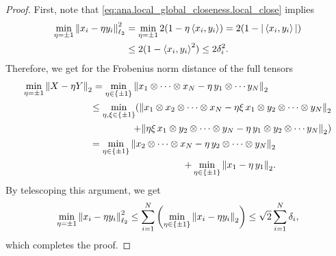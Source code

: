 \begin{proof}
  First, note that \cref{eq:ana.local_global_closeness.local_close} implies
  \begin{align}
    \min_{\eta = \pm 1} {\Vert x_i - \eta y_i\Vert}_{\ell_2}^2
    &= \min_{\eta = \pm 1} 2 (1 - \eta \braket{x_i, y_i})
    = 2 (1 - {\vert\braket{x_i, y_i}\vert}) \\
    &\le 2 (1 - \braket{x_i, y_i}^2)
    \le 2 \delta_i^2.
  \end{align}
  Therefore, we get for the Frobenius norm distance of the full tensors
  \begin{align}
    \min_{\eta=\pm1} {\left\Vert X - \eta Y\right\Vert}_{2}
    &= \min_{\eta \in \{\pm1\}} {\left\Vert x_1 \otimes \cdots \otimes x_N - \eta\, y_1 \otimes \cdots y_N\right\Vert}_{2} \\
    &\begin{aligned}
      \le \min_{\eta,\xi \in \{\pm1\}} \Large(
        {\left\Vert x_1 \otimes x_2 \otimes \cdots \otimes x_N - \eta \xi \, x_1 \otimes y_2 \otimes \cdots \otimes y_N\right\Vert}_{2} \\
        + {\left\Vert\eta \xi \, x_1 \otimes y_2 \otimes \cdots \otimes y_N - \eta\, y_1 \otimes y_2 \otimes \cdots y_N\right\Vert}_{2}
      \Large)
    \end{aligned}\\
    &\begin{aligned}
      = \min_{\eta\in\{\pm1\}} {\left\Vert x_2 \otimes \cdots \otimes x_N - \eta \, y_2 \otimes \cdots \otimes y_N\right\Vert}_{2} \\
        + \min_{\eta\in\{\pm1\}} {\left\Vert x_1 - \eta\, y_1\right\Vert}_{2}.
    \end{aligned}
  \end{align}
  By telescoping this argument, we get
  \[
    \min_{\eta = \pm 1} {\Vert x_i - \eta y_i\Vert}_{\ell_2}^2
    \le \sum_{i=1}^N \left( \min_{\eta\in\{\pm1\}} {\left\Vert x_i - \eta y_i\right\Vert}_{2} \right)
    \le \sqrt{2} \sum_{i=1}^N \delta_i,
  \]
  which completes the proof.
\end{proof}



